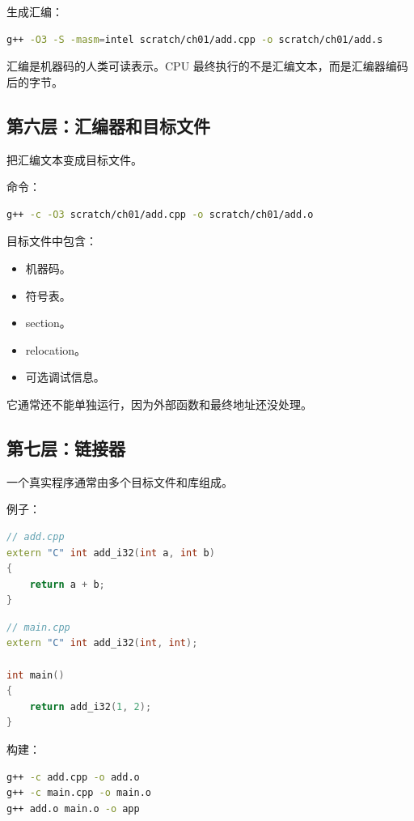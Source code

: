 生成汇编：

\begin{lstlisting}[language=bash]
g++ -O3 -S -masm=intel scratch/ch01/add.cpp -o scratch/ch01/add.s
\end{lstlisting}

汇编是机器码的人类可读表示。CPU 最终执行的不是汇编文本，而是汇编器编码后的字节。

\subsection{第六层：汇编器和目标文件}

 把汇编文本变成目标文件。

命令：

\begin{lstlisting}[language=bash]
g++ -c -O3 scratch/ch01/add.cpp -o scratch/ch01/add.o
\end{lstlisting}

目标文件中包含：

\begin{itemize}
  \item 机器码。
  \item 符号表。
  \item section。
  \item relocation。
  \item 可选调试信息。
\end{itemize}

它通常还不能单独运行，因为外部函数和最终地址还没处理。

\subsection{第七层：链接器}

一个真实程序通常由多个目标文件和库组成。

例子：

\begin{lstlisting}[language=C++]
// add.cpp
extern "C" int add_i32(int a, int b)
{
    return a + b;
}
\end{lstlisting}

\begin{lstlisting}[language=C++]
// main.cpp
extern "C" int add_i32(int, int);

int main()
{
    return add_i32(1, 2);
}
\end{lstlisting}

构建：

\begin{lstlisting}[language=bash]
g++ -c add.cpp -o add.o
g++ -c main.cpp -o main.o
g++ add.o main.o -o app
\end{lstlisting}

